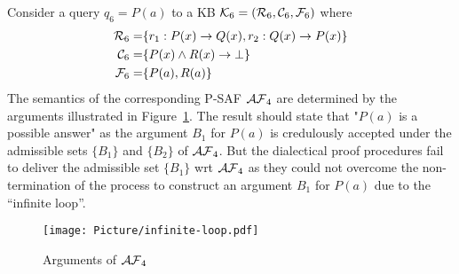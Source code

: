 \begin{example} Consider a query $q_6 = P(a)$ to a \datalogPM KB $\mathcal{K}_6 = (\mathcal{R}_6 , \mathcal{C}_6 , \mathcal{F}_6)$ where
\begin{align*}
    \mathcal{R}_6 = & \{r_1: P(x) \rightarrow Q(x), r_2: Q(x) \rightarrow P(x) \} \\
    \mathcal{C}_6 = & \{ P(x) \land R(x) \rightarrow \bot \} \\
    \mathcal{F}_6 = & \{P(a) , R(a)\}
\end{align*}
The semantics of the corresponding P-SAF $\mathcal{AF}_4$ are determined by the arguments illustrated in Figure~\ref{fig:infinite-loop}. The result should state that "$P(a)$ is a possible answer" as the argument $B_1$ for $P(a)$ is credulously accepted under the admissible sets $\{B_1\}$  and $\{B_2\}$ of $\mathcal{AF}_4$. 
 But the dialectical proof procedures fail to deliver the admissible set $\{ B_1 \}$ wrt $\mathcal{AF}_4$
as they could not overcome the non-termination of the process to construct an argument $B_1$ for $P(a)$ due to the “infinite loop”. 
    
\end{example}
\begin{figure}
    \centering
    \texttt{[image: Picture/infinite-loop.pdf]}
    \caption{Arguments of $\mathcal{AF}_4$}
    \label{fig:infinite-loop}
\end{figure}



%
%


